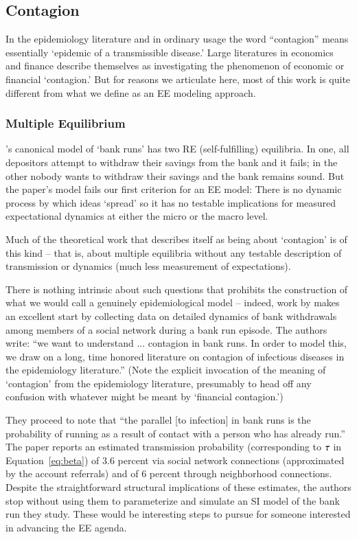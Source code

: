 
\subsection{Contagion}\label{subsec:Contagion}

In the epidemiology literature and in ordinary usage the word ``contagion'' means essentially `epidemic of a transmissible disease.'  Large literatures in economics and finance describe themselves as investigating the phenomenon of economic or financial `contagion.'  But for reasons we articulate here, most of this work is quite different from what we define as an EE modeling approach.

\subsubsection{Multiple Equilibrium}\label{subsubsec:multipleEqulibrium}

\href{https://www.jstor.org/stable/1837095}{\cite{diamond_bank_1983}}'s canonical model of `bank runs' has two RE (self-fulfilling) equilibria.  In one, all depositors attempt to withdraw their savings from the bank and it fails; in the other nobody wants to withdraw their savings and the bank remains sound.  But the paper's model fails our first criterion for an EE model: There is no dynamic process by which ideas `spread' so it has no testable implications for measured expectational dynamics at either the micro or the macro level.

Much of the theoretical work that describes itself as being about `contagion' is of this kind -- that is, about multiple equilibria without any testable description of transmission or dynamics (much less measurement of expectations).

There is nothing intrinsic about such questions that prohibits the construction of what we would call a genuinely epidemiological model -- indeed, work by \cite{iyer2012understanding} makes an excellent start by collecting data on detailed dynamics of bank withdrawals among members of a social network during a bank run episode.  The authors write:
``we want to understand ... contagion in bank runs. In order to model this, we draw on a long, time honored literature on contagion of infectious diseases in the epidemiology literature.''   (Note the explicit invocation of the meaning of `contagion' from the epidemiology literature, presumably to head off any confusion with whatever might be meant by `financial contagion.')

They proceed to note that ``the parallel [to infection] in bank runs is the probability of running as a result of contact with a person who has already run.''  The paper reports an estimated transmission probability (corresponding to  $\tau$ in Equation~\ref{eq:beta}) of 3.6 percent via social network connections (approximated by the account referrals)  and of 6 percent through neighborhood connections. Despite the straightforward structural implications of these estimates, the authors stop without using them to parameterize and simulate an SI model of the bank run they study. These would be interesting steps to pursue for someone interested in advancing the EE agenda.


